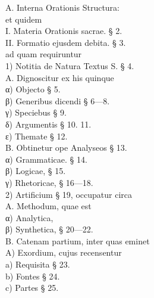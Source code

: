 \begin{flushleft}
A. Interna Orationis Structura:\\
\hspace*{1.2em}et quidem\\
\hspace*{1.2em}I. Materia Orationis sacrae. § 2.\\
\hspace*{1.2em}II. Formatio ejusdem debita. § 3.\\
\hspace*{2.4em}ad quam requiruntur\\
\hspace*{2.4em}1) Notitia de Natura Textus S. § 4.\\
\hspace*{3.6em}A. Dignoscitur ex his quinque\\
\hspace*{4.8em}α) Objecto § 5.\\
\hspace*{4.8em}β) Generibus dicendi § 6—8.\\
\hspace*{4.8em}γ) Speciebus § 9.\\
\hspace*{4.8em}δ) Argumentis § 10. 11.\\
\hspace*{4.8em}ε) Themate § 12.\\
\hspace*{3.6em}B. Obtinetur ope Analyseos § 13.\\
\hspace*{4.8em}α) Grammaticae. § 14.\\
\hspace*{4.8em}β) Logicae, § 15.\\
\hspace*{4.8em}γ) Rhetoricae, § 16—18.\\
\hspace*{2.4em}2) Artificium § 19, occupatur circa\\
\hspace*{3.6em}A. Methodum, quae est\\
\hspace*{4.8em}α) Analytica,\\
\hspace*{4.8em}β) Synthetica, § 20—22.\\
\hspace*{3.6em}B. Catenam partium, inter quas eminet\\
\hspace*{4.8em}A) Exordium, cujus recensentur\\
\hspace*{6em}a) Requisita § 23.\\
\hspace*{6em}b) Fontes § 24.\\
\hspace*{6em}c) Partes § 25.
\end{flushleft}


